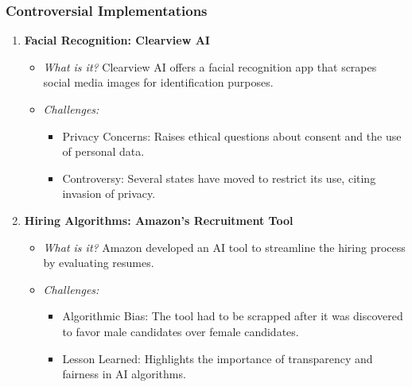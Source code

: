 \documentclass[aspectratio=169]{beamer}
\begin{document}
\begin{frame}[fragile]
  \frametitle{Controversial Implementations}
  \begin{enumerate}
    \item \textbf{Facial Recognition: Clearview AI}
      \begin{itemize}
        \item \textit{What is it?} Clearview AI offers a facial recognition app that scrapes social media images for identification purposes.
        \item \textit{Challenges:}
          \begin{itemize}
            \item Privacy Concerns: Raises ethical questions about consent and the use of personal data.
            \item Controversy: Several states have moved to restrict its use, citing invasion of privacy.
          \end{itemize}
      \end{itemize}

    \item \textbf{Hiring Algorithms: Amazon's Recruitment Tool}
      \begin{itemize}
        \item \textit{What is it?} Amazon developed an AI tool to streamline the hiring process by evaluating resumes.
        \item \textit{Challenges:}
          \begin{itemize}
            \item Algorithmic Bias: The tool had to be scrapped after it was discovered to favor male candidates over female candidates.
            \item Lesson Learned: Highlights the importance of transparency and fairness in AI algorithms.
          \end{itemize}
      \end{itemize}
  \end{enumerate}
\end{frame}
\end{document}
